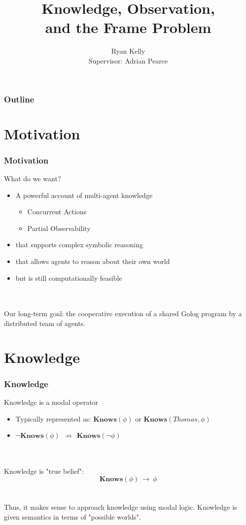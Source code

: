 \documentclass{beamer}
\title{Knowledge, Observation,\\ and the Frame Problem}
\author[Ryan Kelly (rfk@csse.unimelb.edu.au)]{Ryan Kelly \\ Supervisor: Adrian Pearce}
\begin{document}
\begin{frame}
  \titlepage
\end{frame}

\begin{frame}
  \frametitle{Outline}
  \tableofcontents
\end{frame}

\section{Motivation}

\begin{frame}
\frametitle{Motivation}
What do we want?
\begin{itemize}
\item A powerful account of multi-agent knowledge
  \begin{itemize}
  \item Concurrent Actions
  \item Partial Observability
  \end{itemize}
\item that supports complex symbolic reasoning
\item that allows agents to reason about their own world
\item but is still computationally feasible
\end{itemize}
\ \\
\ \\
\pause
Our long-term goal: the cooperative execution of a shared Golog program
by a distributed team of agents.
\end{frame}


\section{Knowledge}

\begin{frame}
\frametitle{Knowledge}

Knowledge is a modal operator
\begin{itemize}
\item Typically represented as: $\mathbf{Knows}(\phi)$ or $\mathbf{Knows}(Thomas,\phi)$
\item $\neg\mathbf{Knows}(\phi)\ \ \not\rightarrow\ \ \mathbf{Knows}(\neg\phi)$
\end{itemize}
\ \\
\ \\
Knowledge is "true belief":
\[ \mathbf{Knows}(\phi)\ \rightarrow\ \phi \]
\ \\
\ \\
Thus, it makes sense to approach knowledge using modal logic.
Knowledge is given semantics in terms of "possible worlds".

\end{frame}
\end{document}
